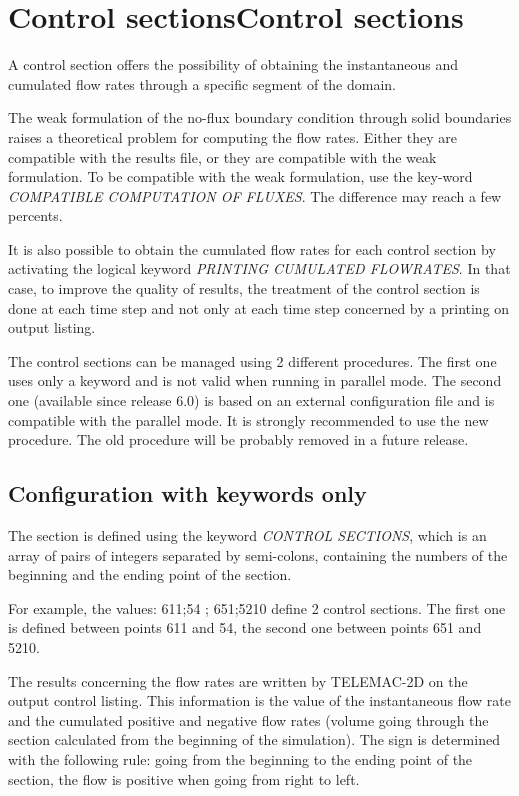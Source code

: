\section{ Control sectionsControl sections}

 A control section offers the possibility of obtaining the instantaneous and cumulated flow rates through a specific segment of the domain.

 The weak formulation of the no-flux boundary condition through solid boundaries raises a theoretical problem for computing the flow rates. Either they are compatible with the results file, or they are compatible with the weak formulation. To be compatible with the weak formulation, use the key-word \textit{COMPATIBLE COMPUTATION OF FLUXES}. The difference may reach a few percents.

 It is also possible to obtain the cumulated flow rates for each control section by activating the logical keyword \textit{PRINTING CUMULATED FLOWRATES}. In that case, to improve the quality of results, the treatment of the control section is done at each time step and not only at each time step concerned by a printing on output listing.

 The control sections can be managed using 2 different procedures. The first one uses only a keyword and is not valid when running in parallel mode. The second one (available since release 6.0) is based on an external configuration file and is compatible with the parallel mode. It is strongly recommended to use the new procedure. The old procedure will be probably removed in a future release.


\subsection{ Configuration with keywords only}

 The section is defined using the keyword \textit{CONTROL SECTIONS}, which is an array of pairs of integers separated by semi-colons, containing the numbers of the beginning and the ending point of the section.

 For example, the values: 611;54 ; 651;5210 define 2 control sections. The first one is defined between points 611 and 54, the second one between points 651 and 5210.

 The results concerning the flow rates are written by TELEMAC-2D on the output control listing. This information is the value of the instantaneous flow rate and the cumulated positive and negative flow rates (volume going through the section calculated from the beginning of the simulation). The sign is determined with the following rule: going from the beginning to the ending point of the section, the flow is positive when going from right to left.

